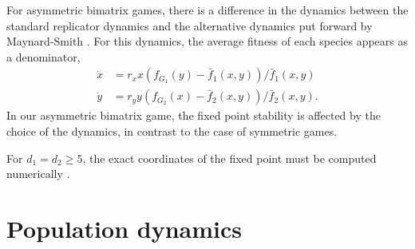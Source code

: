 \documentclass{pnastwo}
\begin{document}
\begin{article}

For asymmetric bimatrix games, there is a difference in the dynamics between the standard replicator dynamics and the 
alternative dynamics put forward by Maynard-Smith \cite{maynard-smith:1982to}.
For this dynamics, the average fitness of each species appears as a denominator,
\begin{align}
\dot{x} &= r_x x \left(f_{G_1}(y) -  \bar{f}_1(x,y) \right)/\bar{f}_1(x,y) \nonumber \\
\dot{y} &= r_y y \left(f_{G_2}(x) -  \bar{f}_2(x,y) \right)/\bar{f}_2(x,y).
\label{eq:repeqs}
\end{align}
In our asymmetric bimatrix game, the fixed point stability is affected by the choice of the dynamics, in contrast to the case of symmetric games. 

For $d_1=d_2 \geq 5$, the exact coordinates of the fixed point must be computed numerically \cite{abel:AO:1824,stewart:book:2004}.


\section{Population dynamics}


\end{article}
\end{document}
